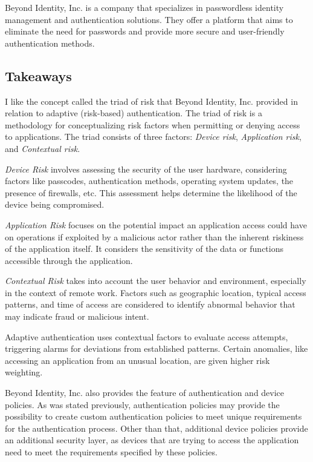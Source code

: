 Beyond Identity, Inc. is a company that specializes in passwordless identity management and authentication solutions. They offer a platform that aims to eliminate the need for passwords and provide more secure and user-friendly authentication methods.

\subsection*{Takeaways}
I like the concept called the triad of risk that Beyond Identity, Inc. provided in relation to adaptive (risk-based) authentication.
The triad of risk is a methodology for conceptualizing risk factors when permitting or denying access to applications.
The triad consists of three factors: \textit{Device risk}, \textit{Application risk}, and \textit{Contextual risk}.

\textit{Device Risk} involves assessing the security of the user hardware, considering factors like passcodes, authentication methods, operating system updates, the presence of firewalls, etc.
This assessment helps determine the likelihood of the device being compromised.

\textit{Application Risk} focuses on the potential impact an application access could have on operations if exploited by a malicious actor rather than the inherent riskiness of the application itself.
It considers the sensitivity of the data or functions accessible through the application.

\textit{Contextual Risk} takes into account the user behavior and environment, especially in the context of remote work.
Factors such as geographic location, typical access patterns, and time of access are considered to identify abnormal behavior that may indicate fraud or malicious intent.

Adaptive authentication uses contextual factors to evaluate access attempts, triggering alarms for deviations from established patterns.
Certain anomalies, like accessing an application from an unusual location, are given higher risk weighting.

Beyond Identity, Inc. also provides the feature of authentication and device policies.
As was stated previously, authentication policies may provide the possibility to create custom authentication policies to meet unique requirements for the authentication process.
Other than that, additional device policies provide an additional security layer, as devices that are trying to access the application need to meet the requirements specified by these policies.


